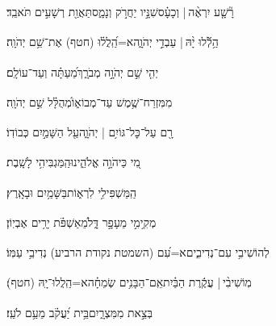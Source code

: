 \documentclass[12pt]{article}
\newcommand{\loc}[1]{\textsuperscript{\locf{#1}}}
\begin{document}
{\loc{ י}~}‏רָ֘שָׁ֤ע יִרְאֶ֨ה | {\hfill}וְכָעָ֗ס\newline\hspace*{.5em}שִׁנָּ֣יו יַחֲרֹ֣ק וְנָמָ֑ס{\hfill}תַּאֲוַ֖ת רְשָׁעִ֣ים תֹּאבֵֽד׃\par\pend

\pstart[\subsection*{\textcolor{red}{פרק קיג}}]\label{פרק קיג}
{\loc{ א}~}‏הַ֥לְﬞלוּ יָ֨הּ | \newline\hspace*{.5em} עַבְדֵ֣י יְהֹוָ֑ה{\hfill}א=הַֽ֝לֲל֗וּ (חטף) אֶת־שֵׁ֥ם יְהֹוָֽה׃\par

{\loc{ ב}~}‏יְהִ֤י שֵׁ֣ם יְהֹוָ֣ה מְבֹרָ֑ךְ{\hfill}מֵ֝עַתָּ֗ה וְעַד־עוֹלָֽם׃\par

{\loc{ ג}~}‏מִמִּזְרַח־שֶׁ֥מֶשׁ עַד־מְבוֹא֑וֹ{\hfill}מְ֝הֻלָּ֗ל שֵׁ֣ם יְהֹוָֽה׃\par

{\loc{ ד}~}‏רָ֖ם עַל־כׇּל־גּוֹיִ֥ם | יְהֹוָ֑ה{\hfill}עַ֖ל הַשָּׁמַ֣יִם כְּבוֹדֽוֹ׃\par

{\loc{ ה}~}‏מִ֭י כַּיהֹוָ֣ה אֱלֹהֵ֑ינוּ{\hfill}הַֽמַּגְבִּיהִ֥י לָשָֽׁבֶת׃\par

{\loc{ ו}~}‏הַֽמַּשְׁפִּילִ֥י לִרְא֑וֹת{\hfill}בַּשָּׁמַ֥יִם וּבָאָֽרֶץ׃\par

{\loc{ ז}~}‏מְקִ֥ימִ֣י מֵעָפָ֣ר דָּ֑ל{\hfill}מֵ֝אַשְׁפֹּ֗ת יָרִ֥ים אֶבְיֽוֹן׃\par

{\loc{ ח}~}‏לְהוֹשִׁיבִ֥י עִם־נְדִיבִ֑ים{\hfill}א=עִ֝ם (השמטת נקודת הרביע) נְדִיבֵ֥י עַמּֽוֹ׃\par

{\loc{ ט}~}‏מֽוֹשִׁיבִ֨י | {\hfill}עֲקֶ֬רֶת הַבַּ֗יִת\newline\hspace*{.5em}אֵֽם־הַבָּנִ֥ים שְׂמֵחָ֗ה{\hfill}א=הַֽלֲלוּ־יָֽהּ (חטף)׃\par\pend
\ledpb
\pstart[\subsection*{\textcolor{red}{פרק קיד}}]\label{פרק קיד}
{\loc{ א}~}‏בְּצֵ֣את  מִמִּצְרָ֑יִם{\hfill}בֵּ֥ית יַ֝עֲקֹ֗ב מֵעַ֥ם לֹעֵֽז׃\par
\end{document}

